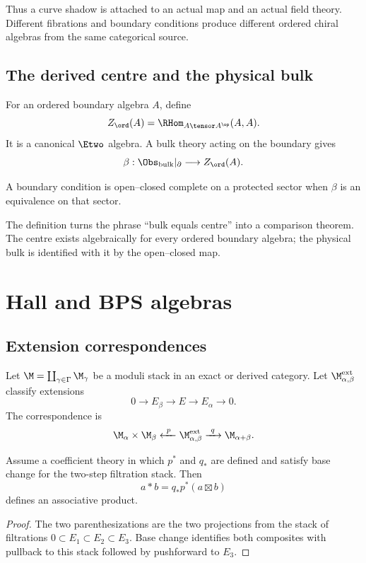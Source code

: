 Thus a curve shadow is attached to an actual map and an actual field theory. Different fibrations and boundary conditions produce different ordered chiral algebras from the same categorical source.

\chapter{The derived centre and the physical bulk}
For an ordered boundary algebra $A$, define
\[
 Z_{\ord}(A)=\RHom_{A\tensor A^{\op}}(A,A).
\]
It is a canonical $\Etwo$ algebra. A bulk theory acting on the boundary gives
\[
 \beta:\Obs_{\mathrm{bulk}}|_{\partial}\longrightarrow Z_{\ord}(A).
\]

\begin{definition}
A boundary condition is open--closed complete on a protected sector when $\beta$ is an equivalence on that sector.
\end{definition}

The definition turns the phrase ``bulk equals centre'' into a comparison theorem. The centre exists algebraically for every ordered boundary algebra; the physical bulk is identified with it by the open--closed map.

\part{Hall and BPS algebras}

\chapter{Extension correspondences}
Let $\M=\coprod_{\gamma\in\Gamma}\M_\gamma$ be a moduli stack in an exact or derived category. Let $\M^{\mathrm{ext}}_{\alpha,\beta}$ classify extensions
\[
 0\longrightarrow E_\beta\longrightarrow E\longrightarrow E_\alpha\longrightarrow0.
\]
The correspondence is
\[
 \M_\alpha\times\M_\beta
 \xleftarrow{\ p\ }
 \M^{\mathrm{ext}}_{\alpha,\beta}
 \xrightarrow{\ q\ }
 \M_{\alpha+\beta}.
\]

\begin{theorem}
Assume a coefficient theory in which $p^*$ and $q_*$ are defined and satisfy base change for the two-step filtration stack. Then
\[
 a*b=q_*p^*(a\boxtimes b)
\]
defines an associative product.
\end{theorem}
\begin{proof}
The two parenthesizations are the two projections from the stack of filtrations $0\subset E_1\subset E_2\subset E_3$. Base change identifies both composites with pullback to this stack followed by pushforward to $E_3$.
\end{proof}

